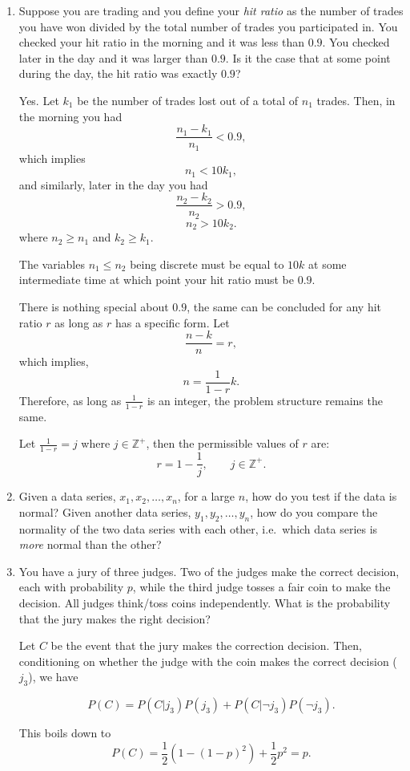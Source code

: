 \documentclass{amsart}
\theoremstyle{plain}
\numberwithin{equation}{section}
\begin{document}
\begin{enumerate}
\item Suppose you are trading and you define 
your \emph{hit ratio} as the number of trades you have 
won divided by the total number of trades you 
participated in.
You checked your hit ratio in the morning 
and it was less than $0.9$. You checked later
in the day and it was larger than $0.9$. Is it the 
case that at some point during the day, the hit 
ratio was exactly $0.9$?

Yes. Let $k_1$ be the number of trades lost out of a total of $n_1$
trades. Then, in the morning you had
$$ \frac{n_1-k_1}{n_1} < 0.9,$$
which implies 
$$n_1 < 10k_1,$$ 
and similarly, later in the day you had
$$ \frac{n_2-k_2}{n_2} > 0.9,$$
$$n_2 > 10k_2.$$ 
where $n_2 \geq n_1$ and $k_2\geq k_1$.


The variables $n_1 \leq n_2$ being discrete must be equal 
to $10k$ at some intermediate time at which point 
your hit ratio must be $0.9$.

There is nothing special about $0.9$, the same can 
be concluded for any hit ratio $r$ as long as $r$ has a 
specific form. Let
$$\frac{n-k}{n} = r,$$ which 
implies,
$$ n = \frac{1}{1-r} k.$$
Therefore, as long as $\frac{1}{1-r}$ is an integer,
the problem structure remains the same. 

Let $\frac{1}{1-r} = j$ where $j \in \mathbb{Z^+}$, then
the permissible values of $r$ are:
$$r  = 1 - \frac{1}{j}, \qquad j \in \mathbb{Z^+}.$$

\item Given a data series, $x_1, x_2, \ldots, x_n$, for 
a large $n$, how do you test if the data is normal? Given 
another data series, $y_1, y_2, \ldots, y_n$, how do you 
compare the normality of the two data series with each other, 
i.e.\ which data series is \emph{more} normal than the other?

\item You have a jury of three judges. Two of the judges
make the correct decision, each with probability $p$, while
the third judge tosses a fair coin to make the decision. 
All judges think/toss coins independently. What is the 
probability that the jury makes the right decision?

Let $C$ be the event that the jury makes the correction decision. 
Then, conditioning on whether the judge with the coin
makes the correct decision  ($j_3$), we have

$$P(C) = P(C|j_3) P(j_3)+P(C|\neg j_3)P(\neg j_3).$$

This boils down to
$$P(C) = \frac{1}{2}\left(1-(1-p)^2\right) + \frac{1}{2} p^2 = p.$$


\end{enumerate}
\end{document}
